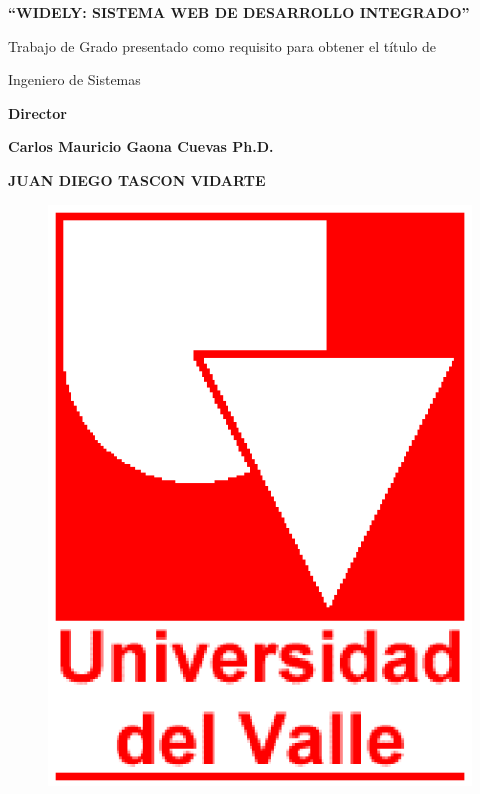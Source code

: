 \newpage


\begin{center} \textbf{\newline\newline} \end{center}
\begin{center} \textbf{``WIDELY: SISTEMA WEB DE DESARROLLO INTEGRADO''} \end{center}

\vspace{5em}

\begin{center} Trabajo de Grado presentado como requisito para obtener el título de\end{center}
\begin{center} Ingeniero de Sistemas \end{center}

\vspace{1em}

\begin{center} \textbf{ Director } \end{center}
\begin{center} \textbf{ Carlos Mauricio Gaona Cuevas Ph.D. } \end{center}

\vspace{5em}

\begin{center} \textbf{JUAN DIEGO TASCON VIDARTE} \end{center}

\vspace{3em}


\begin{figure}[h]
	\centering
	\includegraphics[scale=0.3]{./img/uvlogo}
	\label{img:uvlogo-p2}
\end{figure}

